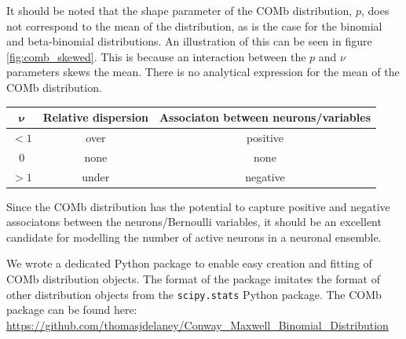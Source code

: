 \documentclass[a4paper,12pt]{article}
\theoremstyle{definition}
\begin{document}
      It should be noted that the shape parameter of the COMb distribution, $p$, does not correspond to the mean of the distribution, as is the case for the binomial and beta-binomial distributions. An illustration of this can be seen in figure \ref{fig:comb_skewed}. This is because an interaction between the $p$ and $\nu$ parameters skews the mean. There is no analytical expression for the mean of the COMb distribution.

      \begin{center}
        \begin{tabular}[h]{|c|c|c|}
          \hline
          $\boldsymbol{\nu}$  & \textbf{Relative dispersion}  & \textbf{Associaton between neurons/variables} \\ \hline
          $<1$                & over                          & positive                                      \\ \hline
          $0$                 & none                          & none                                          \\ \hline
          $>1$                & under                         & negative                                      \\ \hline
        \end{tabular}
      \end{center}

      Since the COMb distribution has the potential to capture positive and negative associatons between the neurons/Bernoulli variables, it should be an excellent candidate for modelling the number of active neurons in a neuronal ensemble.

      We wrote a dedicated Python package to enable easy creation and fitting of COMb distribution objects. The format of the package imitates the format of other distribution objects from the \texttt{scipy.stats} Python package. The COMb package can be found here: \\
      \url{https://github.com/thomasjdelaney/Conway_Maxwell_Binomial_Distribution}

      \newpage
\end{document}
